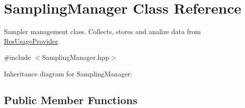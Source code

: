 \hypertarget{classSamplingManager}{}\section{Sampling\+Manager Class Reference}
\label{classSamplingManager}


Sampler management class. Collects, stores and analize data from \hyperlink{classResUsageProvider}{Res\+Usage\+Provider}.  




{\ttfamily \#include $<$Sampling\+Manager.\+hpp$>$}



Inheritance diagram for Sampling\+Manager\+:
\subsection*{Public Member Functions}

